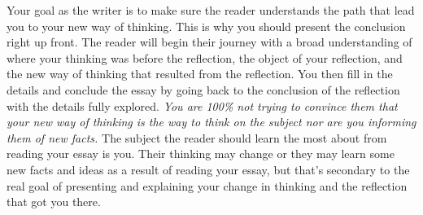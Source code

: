 \documentclass[nobib]{tufte-handout}
\begin{document}
Your goal as the writer is to make sure the reader understands the path that lead you to your new way of thinking. This is why you should present the conclusion right up front. The reader will begin their journey with a broad understanding of  where your thinking was before the reflection, the object of your reflection, and the new way of thinking that resulted from the reflection. You then fill in the details and conclude the essay by going back to the conclusion of the reflection with the details fully explored. \textit{You are 100\% not trying to convince them that your new way of thinking is \textit{the} way to think on the subject nor are you informing them of new facts.} The subject the reader should learn the most about from reading your essay is you. Their thinking may change or they may learn some new facts and ideas as a result of reading your essay, but that's secondary to the real goal of presenting and explaining your change in thinking and the reflection that got you there.
\end{document}
